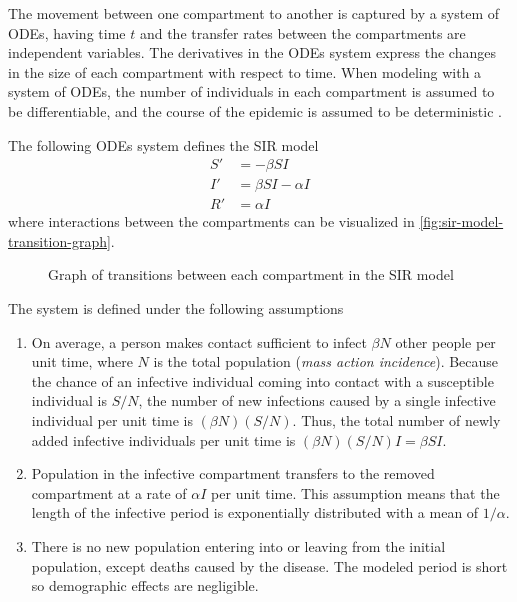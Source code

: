 The movement between one compartment to another is captured by a system of \glspl{ODE}, having time $t$ and the transfer rates between the compartments are independent variables.
The derivatives in the \glspl{ODE} system express the changes in the size of each compartment with respect to time.
When modeling with a system of \glspl{ODE}, the number of individuals in each compartment is assumed to be differentiable, and the course of the epidemic is assumed to be deterministic \cite{brauerCompartmentalModelsEpidemiology2008}.

The following \glspl{ODE} system defines the SIR model \cite{brauerCompartmentalModelsEpidemiology2008, kermackContributionMathematicalTheory1927}
\begin{align*}
    S' &= - \beta S I \\
    I' &= \beta S I - \alpha I \\
    R' &= \alpha I
\end{align*}
where interactions between the compartments can be visualized in \autoref{fig:sir-model-transition-graph}.
\begin{figure}
    \centering
    \caption{Graph of transitions between each compartment in the SIR model}
    \label{fig:sir-model-transition-graph}
\end{figure}
The system is defined under the following assumptions \cite{brauerCompartmentalModelsEpidemiology2008, kermackContributionMathematicalTheory1927}
\begin{enumerate}
    \item On average, a person makes contact sufficient to infect $\beta N$ other people per unit time, where $N$ is the total population (\textit{mass action incidence}).
    Because the chance of an infective individual coming into contact with a susceptible individual is $S / N$, the number of new infections caused by a single infective individual per unit time is $(\beta N) (S / N)$.
    Thus, the total number of newly added infective individuals per unit time is $(\beta N) (S / N) I = \beta S I$.
    \label{assumption:basic-sir-contact-rate}

    \item Population in the infective compartment transfers to the removed compartment at a rate of $\alpha I$ per unit time.
    This assumption means that the length of the infective period is exponentially distributed with a mean of $1 / \alpha$.
    \label{assumption:basic-sir-infective-period}

    \item There is no new population entering into or leaving from the initial population, except deaths caused by the disease.
    The modeled period is short so demographic effects are negligible.
    \label{assumption:basic-sir-constant-population}
\end{enumerate}


